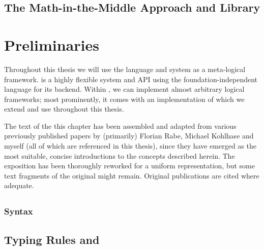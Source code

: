 \documentclass[a4paper,11pt]{book}
\begin{document}
\section{The Math-in-the-Middle Approach and Library}\label{sec:lf:mitm}



\chapter{Preliminaries}\label{ch:intro:prelim}

Throughout this thesis we will use the \mmt language and system as a meta-logical framework. \mmt is a highly flexible system and API using the foundation-independent \omdoc language for its backend. Within \mmt, we can implement almost arbitrary logical frameworks; most prominently, it comes with an implementation of \LF which we extend and use throughout this thesis.

\begin{disclaimer*}
	The text of the this chapter has been assembled and adapted from various previously published papers by (primarily) Florian Rabe, Michael Kohlhase and myself (all of which are referenced in this thesis), since they have emerged as the most suitable, concise introductions to the concepts described herein. The exposition has been thoroughly reworked for a uniform representation, but some text fragments of the original might remain. Original publications are cited where adequate.
\end{disclaimer*}


\section{\ommt}\label{sec:intro:prelim:mmt}


%

\subsection{\mmt Syntax}\label{sec:prelim:notation}





\section{Typing Rules and \LF}\label{sec:intro:prelim:lf}

\end{document}
